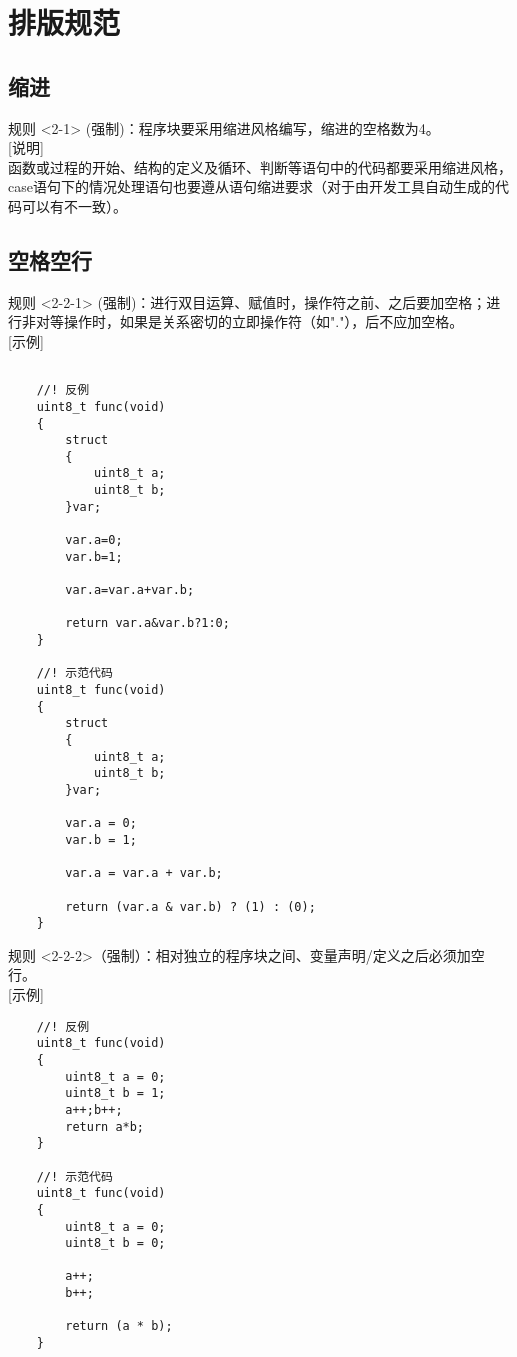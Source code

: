 \documentclass[UTF8,a4paper,12pt]{article}
\begin{document}
	\newpage
	
	\section{排版规范}
	\subsection{缩进}
	规则 <2-1> (强制)：程序块要采用缩进风格编写，缩进的空格数为4。\\
	
	[说明]\\
	函数或过程的开始、结构的定义及循环、判断等语句中的代码都要采用缩进风格，case语句下的情况处理语句也要遵从语句缩进要求（对于由开发工具自动生成的代码可以有不一致）。\\
	
	\subsection{空格空行}
	规则 <2-2-1> (强制)：进行双目运算、赋值时，操作符之前、之后要加空格；进行非对等操作时，如果是关系密切的立即操作符（如"."），后不应加空格。\\
	
	[示例]\\
	\begin{lstlisting}
	
	//! 反例
	uint8_t func(void)
	{
		struct
		{
			uint8_t a;
			uint8_t b;
		}var;
		
		var.a=0;
		var.b=1;
		
		var.a=var.a+var.b;
		
		return var.a&var.b?1:0;
	}
	
	//! 示范代码
	uint8_t func(void)
	{
		struct
		{
			uint8_t a;
			uint8_t b;
		}var;
		
		var.a = 0;
		var.b = 1;
		
		var.a = var.a + var.b;
		
		return (var.a & var.b) ? (1) : (0);
	}
	\end{lstlisting}
	规则 <2-2-2>（强制）：相对独立的程序块之间、变量声明/定义之后必须加空行。\\
	
	[示例]\\
	\begin{lstlisting}
	//! 反例
	uint8_t func(void)
	{
		uint8_t a = 0;
		uint8_t b = 1;
		a++;b++;
		return a*b;
	}
	
	//! 示范代码
	uint8_t func(void)
	{
		uint8_t a = 0;
		uint8_t b = 0;
		
		a++;
		b++;
		
		return (a * b);
	}
	\end{lstlisting}
	
\end{document}
